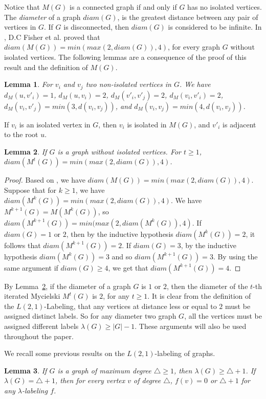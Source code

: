\documentclass{article}
\newtheorem{lemma} {Lemma}
\newtheorem{open problem} {Open Problem}
\numberwithin{lemma}{section}
\numberwithin{theorem}{section}
\numberwithin{cor}{section}
\numberwithin{prop}{section}
\numberwithin{con}{section}
\numberwithin{claim}{section}
\numberwithin{obs}{section}
\numberwithin{dnt}{section}
\begin{document}
Notice that $M(G)$ is a connected graph if and only if $G$ has no isolated vertices. The \textit{diameter} of a graph $diam(G)$, is the greatest distance between any pair of vertices in $G$. If $G$ is disconnected, then $diam(G)$ is considered to be infinite. In \cite{fisher}, D.C Fisher et al. proved that $diam(M(G))=min(max(2, diam(G)), 4)$, for every graph $G$ without isolated vertices. The following lemmas are a consequence of the proof of this result and the definition of $M(G)$.
\begin{lemma}\label{lem2.4} \cite{fisher}
	For $v_i$ and $v_j$ two non-isolated vertices in $G$. We have
	$d_{M}(u,v'_i)=1$, $d_{M}(u,v_i)=2$, $d_{M}(v'_i,v'_j)=2$, $d_{M}(v_i,v'_i)=2$, $d_{M}(v_i,v'_j)=min(3,d(v_i,v_j))$, and $d_{M}(v_i,v_j)=min(4,d(v_i,v_j))$.	
\end{lemma}
If $v_i$ is an isolated vertex in $G$, then $v_i$ is isolated in $M(G)$, and $v'_i$ is adjacent to the root $u$.
\begin{lemma} \label{lem2.5}
	If $G$ is a graph without isolated vertices. For $t\geq 1$,	$diam(M^t(G))=min(max(2, diam(G)), 4)$.
\end{lemma}
\begin{proof}
	Based on \cite{fisher}, we have $diam(M(G))=min(max(2, diam(G)),4)$. Suppose that for $k\geq 1$, we have $diam(M^k(G))=min(max(2, diam(G)), 4)$.  We have $M^{k+1}(G)=M(M^k(G))$, so $diam(M^{k+1}(G))= min(max(2, diam(M^k(G)), 4)$. If $diam(G)=1 \text{ or } 2$, then by the inductive hypothesis $diam(M^k(G))=2$, it follows that $diam(M^{k+1}(G))=2$. If $diam(G)=3$, by the inductive hypothesis $diam(M^k(G))=3$ and so $diam(M^{k+1}(G))=3$. By using the same argument if $diam(G)\geq 4$, we get that $diam(M^{k+1}(G))=4$.
\end{proof}
By Lemma~\ref{lem2.5},  if the diameter of a graph $G$ is $1$ or $2$, then the diameter of the $t$-th iterated Mycielski $M^t(G)$ is $2$, for any $t\geq 1$. It is clear from the definition of the $L(2,1)$-Labeling, that any vertices at distance less or equal to $2$ must be assigned  distinct labels. So for any diameter two graph $G$, all the vertices must be assigned  different labels $\lambda(G)\geq |G|-1$. These arguments will also be used throughout the paper.	
\par We recall some previous results on the $L(2,1)$-labeling of graphs.
\begin{lemma} \label{lem2.6}
	\cite{griggs}
	If $G$ is a graph of maximum degree $\bigtriangleup \geq 1$, then $\lambda(G) \geq \bigtriangleup+1$. If  $\lambda(G)=\bigtriangleup +1$, then for every  vertex $v$ of degree $\bigtriangleup $, $f(v)=0$ or $\bigtriangleup +1$ for any $\lambda$-labeling $f$.
\end{lemma}
\end{document}
